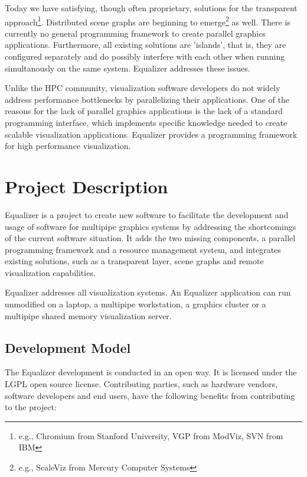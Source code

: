 \documentclass[10pt,a4paper]{scrartcl}
\begin{document}
Today we have satisfying, though often proprietary, solutions for the
transparent approach\footnote{e.g., Chromium from Stanford University,
VGP from ModViz, SVN from IBM}. Distributed scene graphs are beginning
to emerge\footnote{e.g., ScaleViz from Mercury Computer Systems} as
well. There is currently no general programming framework to create
parallel graphics applications. Furthermore, all existing solutions are
'islands', that is, they are configured separately and do possibly
interfere with each other when running simultanously on the same
system. Equalizer addresses these issues.

Unlike the HPC community, visualization software developers do not
widely address performance bottlenecks by parallelizing
their applications. One of the reasons for the lack of parallel graphics
applications is the lack of a standard programming interface, which
implements specific knowledge needed to create scalable visualization
applications. Equalizer provides a programming framework for high
performance visualization.

\section{Project Description}

Equalizer is a project to create new software to facilitate the
development and usage of software for multipipe
graphics systems by addressing the shortcomings of the current
software situation. It adds the two missing components, a
parallel programming framework and a resource management system, and
integrates existing solutions, such as a transparent layer, scene graphs
and remote visualization capabilities.

Equalizer addresses all visualization systems. An Equalizer application
can run unmodified on a laptop, a multipipe workstation, a graphics
cluster or a multipipe shared memory visualization server.

\subsection{Development Model}

The Equalizer development is conducted in an open way. It is licensed
under the LGPL open source license. Contributing parties, such as
hardware vendors, software developers and end users, have the following
benefits from contributing to the project:
\end{document}
